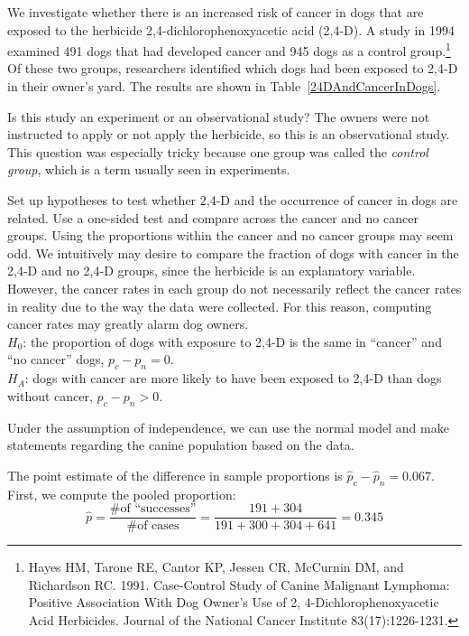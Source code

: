 \begin{examplewrap}
  \begin{nexample}{

 We investigate whether there is an increased risk of cancer in dogs that are exposed to the herbicide 2,4-dichlorophenoxyacetic acid (2,4-D). A study in 1994 examined 491 dogs that had developed cancer and 945 dogs as a control group.\footnote{Hayes HM, Tarone RE, Cantor KP, Jessen CR, McCurnin DM, and Richardson RC. 1991. Case-Control Study of Canine Malignant Lymphoma: Positive Association With Dog Owner's Use of 2, 4-Dichlorophenoxyacetic Acid Herbicides. Journal of the National Cancer Institute 83(17):1226-1231.} Of these two groups, researchers identified which dogs had been exposed to 2,4-D in their owner's yard. The results are shown in Table~\ref{24DAndCancerInDogs}.


}

Is this study an experiment or an observational study? The owners were not instructed to apply or not apply the herbicide, so this is an observational study. This question was especially tricky because one group was called the \emph{control group}, which is a term usually seen in experiments.

Set up hypotheses to test whether 2,4-D and the occurrence of cancer in dogs are related. Use a one-sided test and compare across the cancer and no cancer groups. Using the proportions within the cancer and no cancer groups may seem odd. We intuitively may desire to compare the fraction of dogs with cancer in the 2,4-D and no 2,4-D groups, since the herbicide is an explanatory variable. However, the cancer rates in each group do not necessarily reflect the cancer rates in reality due to the way the data were collected. For this reason, computing cancer rates may greatly alarm dog owners. \\
$H_0$: the proportion of dogs with exposure to 2,4-D is the same in ``cancer'' and ``no cancer'' dogs, $p_c - p_n = 0$. \\
$H_A$: dogs with cancer are more likely to have been exposed to 2,4-D than dogs without cancer, $p_c - p_n > 0$.


Under the assumption of independence, we can use the normal model and make statements regarding the canine population based on the data.

The point estimate of the difference in sample proportions is $\hat{p}_c - \hat{p}_n = 0.067$. First, we   compute the pooled proportion:
$$\hat{p} = \frac{\text{\# of ``successes''}}{\text{\# of cases}} = \frac{191 + 304}{191+300+304+641} = 0.345$$


\end{nexample}
\end{examplewrap}
